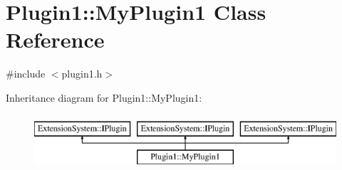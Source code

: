 \hypertarget{class_plugin1_1_1_my_plugin1}{\section{\-Plugin1\-:\-:\-My\-Plugin1 \-Class \-Reference}
\label{class_plugin1_1_1_my_plugin1}
}


{\ttfamily \#include $<$plugin1.\-h$>$}

\-Inheritance diagram for \-Plugin1\-:\-:\-My\-Plugin1\-:\begin{figure}[H]
\begin{center}
\leavevmode
\includegraphics[height=2.000000cm]{class_plugin1_1_1_my_plugin1}
\end{center}
\end{figure}
